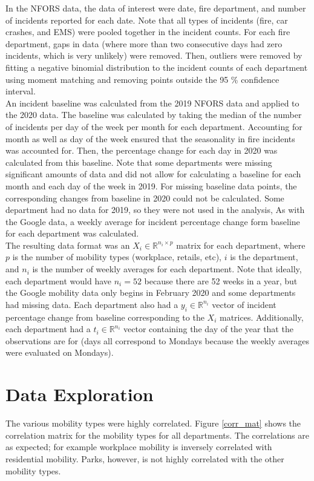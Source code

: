 \documentclass[paper=a4, fontsize=11pt]{scrartcl}
\begin{document}
In the NFORS data, the data of interest were date, fire department, and number of incidents reported for each date. Note that all types of incidents (fire, car crashes, and EMS) were pooled together in the incident counts. For each fire department, gaps in data (where more than two consecutive days had zero incidents, which is very unlikely) were removed. Then, outliers were removed by fitting a negative binomial distribution to the incident counts of each department using moment matching and removing points outside the 95 \% confidence interval.\\


An incident baseline was calculated from the 2019 NFORS data and applied to the 2020 data. The baseline was calculated by taking the median of the number of incidents per day of the week per month for each department. Accounting for month as well as day of the week ensured that the seasonality in fire incidents was accounted for. Then, the percentage change for each day in 2020 was calculated from this baseline. Note that some departments were missing significant amounts of data and did not allow for calculating a baseline for each month and each day of the week in 2019. For missing baseline data points, the corresponding changes from baseline in 2020 could not be calculated.  Some department had no data for 2019, so they were not used in the analysis, As with the Google data, a weekly average for incident percentage change form baseline for each department was calculated. \\

 The resulting data format was an $X_i \in \mathbb{R}^{n_i \times p}$ matrix for each department, where $p$ is the number of mobility types (workplace, retails, etc), $i$ is the department, and $n_i$ is the number of weekly averages for each department. Note that ideally, each department would have $n_i = 52$ because there are 52 weeks in a year, but the Google mobility data only begins in February 2020 and some departments had missing data. Each department also had a $y_i \in \mathbb{R}^{n_i}$ vector of incident percentage change from baseline corresponding to the $X_i$ matrices. Additionally, each department had a $t_i \in \mathbb{R}^{n_i}$ vector containing the day of the year that the observations are for (days all correspond to Mondays because the weekly averages were evaluated on Mondays).


\section{Data Exploration}
The various mobility types were highly correlated. Figure \ref{corr_mat} shows the correlation matrix for the mobility types for all departments. The correlations are as expected; for example workplace mobility is inversely correlated with residential mobility. Parks, however, is not highly correlated with the other mobility types.
\end{document}

